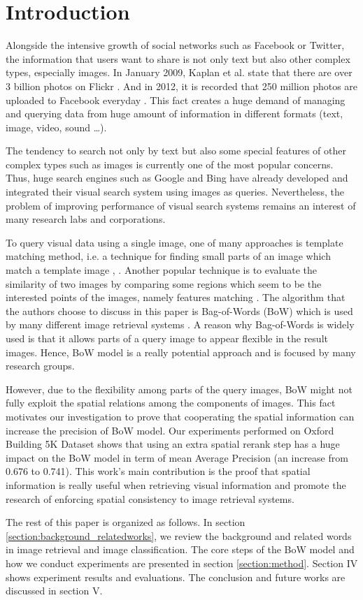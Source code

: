 % 

\section{Introduction} \label{section:introduction}
Alongside the intensive growth of social networks such as Facebook or Twitter, the information that users want to share is not only text but also other complex types, especially images. In January 2009, Kaplan et al. state that there are over 3 billion photos on Flickr \cite{Kaplan201059}. And in 2012, it is recorded that 250 million photos are uploaded to Facebook everyday \cite{1}. This fact creates a huge demand of managing and querying data from huge amount of information in different formats (text, image, video, sound \ldots).

The tendency to search not only by text but also some special features of other complex types such as images is currently one of the most popular concerns. Thus, huge search engines such as Google and Bing have already developed and integrated their visual search system using images as queries. Nevertheless, the problem of improving performance of visual search systems remains an interest of many research labs and corporations.

To query visual data using a single image, one of many approaches is template matching method, i.e. a technique for finding small parts of an image which match a template image \cite{brunelli_template_matching}, \cite{Rosenfeld4309663, Gharavi913587}. Another popular technique is to evaluate the similarity of two images by comparing some regions which seem to be the interested points of the images, namely features matching \cite{Belongie710790, Rubner, Viola990517}. The algorithm that the authors choose to discuss in this paper is Bag-of-Words (BoW) \cite{3} which is used by many different image retrieval systems \cite{3, 2, 7}. A reason why Bag-of-Words is widely used is that it allows parts of a query image to appear flexible in the result images. Hence, BoW model is a really potential approach and is focused by many research groups.

However, due to the flexibility among parts of the query images, BoW might not fully exploit the spatial relations among the components of images. This fact motivates our investigation to prove that cooperating the spatial information can increase the precision of BoW model. Our experiments performed on Oxford Building 5K Dataset shows that using an extra spatial rerank step has a huge impact on the BoW model in term of mean Average Precision (an increase from 0.676 to 0.741). This work's main contribution is the proof that spatial information is really useful when retrieving visual information and promote the research of enforcing spatial consistency to image retrieval systems.

The rest of this paper is organized as follows. In section \ref{section:background_relatedworks}, we review the background and related words in image retrieval and image classification. The core steps of the BoW model and how we conduct experiments are presented in section \ref{section:method}. Section IV shows experiment results and evaluations. The conclusion and future works are discussed in section V.
